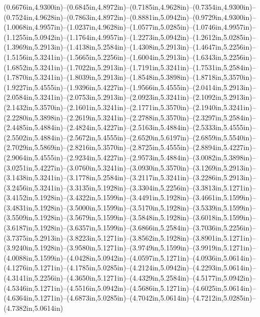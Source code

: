 (0.6676in,4.9300in)--(0.6845in,4.8972in)--(0.7185in,4.9628in)--(0.7354in,4.9300in)--(0.7524in,4.9628in)--(0.7863in,4.8972in)--(0.8881in,5.0942in)--(0.9729in,4.9300in)--(1.0068in,4.9957in)--(1.0237in,4.9628in)--(1.0577in,5.0285in)--(1.0746in,4.9957in)--(1.1255in,5.0942in)--(1.1764in,4.9957in)--(1.2273in,5.0942in)--(1.2612in,5.0285in)--(1.3969in,5.2913in)--(1.4138in,5.2584in)--(1.4308in,5.2913in)--(1.4647in,5.2256in)--(1.5156in,5.3241in)--(1.5665in,5.2256in)--(1.6004in,5.2913in)--(1.6343in,5.2256in)--(1.6852in,5.3241in)--(1.7022in,5.2913in)--(1.7191in,5.3241in)--(1.7531in,5.2584in)--(1.7870in,5.3241in)--(1.8039in,5.2913in)--(1.8548in,5.3898in)--(1.8718in,5.3570in)--(1.9227in,5.4555in)--(1.9396in,5.4227in)--(1.9566in,5.4555in)--(2.0414in,5.2913in)--(2.0584in,5.3241in)--(2.0753in,5.2913in)--(2.0923in,5.3241in)--(2.1092in,5.2913in)--(2.1432in,5.3570in)--(2.1601in,5.3241in)--(2.1771in,5.3570in)--(2.1940in,5.3241in)--(2.2280in,5.3898in)--(2.2619in,5.3241in)--(2.2788in,5.3570in)--(2.3297in,5.2584in)--(2.4485in,5.4884in)--(2.4824in,5.4227in)--(2.5163in,5.4884in)--(2.5333in,5.4555in)--(2.5502in,5.4884in)--(2.5672in,5.4555in)--(2.6520in,5.6197in)--(2.6859in,5.5540in)--(2.7029in,5.5869in)--(2.8216in,5.3570in)--(2.8725in,5.4555in)--(2.8894in,5.4227in)--(2.9064in,5.4555in)--(2.9234in,5.4227in)--(2.9573in,5.4884in)--(3.0082in,5.3898in)--(3.0251in,5.4227in)--(3.0760in,5.3241in)--(3.0930in,5.3570in)--(3.1269in,5.2913in)--(3.1438in,5.3241in)--(3.1778in,5.2584in)--(3.2117in,5.3241in)--(3.2286in,5.2913in)--(3.2456in,5.3241in)--(3.3135in,5.1928in)--(3.3304in,5.2256in)--(3.3813in,5.1271in)--(3.4152in,5.1928in)--(3.4322in,5.1599in)--(3.4491in,5.1928in)--(3.4661in,5.1599in)--(3.4831in,5.1928in)--(3.5000in,5.1599in)--(3.5170in,5.1928in)--(3.5339in,5.1599in)--(3.5509in,5.1928in)--(3.5679in,5.1599in)--(3.5848in,5.1928in)--(3.6018in,5.1599in)--(3.6187in,5.1928in)--(3.6357in,5.1599in)--(3.6866in,5.2584in)--(3.7036in,5.2256in)--(3.7375in,5.2913in)--(3.8223in,5.1271in)--(3.8562in,5.1928in)--(3.8901in,5.1271in)--(3.9240in,5.1928in)--(3.9580in,5.1271in)--(3.9749in,5.1599in)--(3.9919in,5.1271in)--(4.0088in,5.1599in)--(4.0428in,5.0942in)--(4.0597in,5.1271in)--(4.0936in,5.0614in)--(4.1276in,5.1271in)--(4.1785in,5.0285in)--(4.2124in,5.0942in)--(4.2293in,5.0614in)--(4.3141in,5.2256in)--(4.3650in,5.1271in)--(4.4329in,5.2584in)--(4.5177in,5.0942in)--(4.5346in,5.1271in)--(4.5516in,5.0942in)--(4.5686in,5.1271in)--(4.6025in,5.0614in)--(4.6364in,5.1271in)--(4.6873in,5.0285in)--(4.7042in,5.0614in)--(4.7212in,5.0285in)--(4.7382in,5.0614in) 